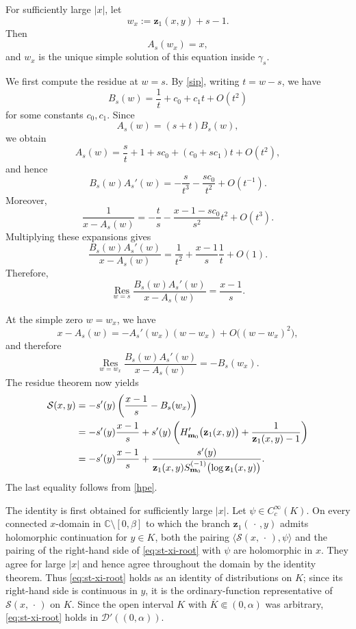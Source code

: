 \documentclass[11pt]{amsart}
\theoremstyle{plain}
\numberwithin{equation}{section}
\numberwithin{theorem}{section}
\numberwithin{figure}{section}
\begin{document}
For sufficiently large \(\lvert x\rvert\), let
\[
    w_x
    :=
    \mathbf z_1(x,y)+s-1.
\]
Then
\[
    A_s(w_x)=x,
\]
and \(w_x\) is the unique simple solution of this equation inside
\(\gamma_s\).

We first compute the residue at \(w=s\). By \eqref{sip}, writing
\(t=w-s\), we have
\[
    B_s(w)
    =
    \frac1t+c_0+c_1t+O(t^2)
\]
for some constants \(c_0,c_1\). Since
\[
    A_s(w)=(s+t)B_s(w),
\]
we obtain
\[
    A_s(w)
    =
    \frac{s}{t}
    +
    1+sc_0
    +
    (c_0+sc_1)t
    +
    O(t^2),
\]
and hence
\[
    B_s(w)A_s'(w)
    =
    -\frac{s}{t^3}
    -
    \frac{sc_0}{t^2}
    +
    O(t^{-1}).
\]
Moreover,
\[
    \frac1{x-A_s(w)}
    =
    -\frac{t}{s}
    -
    \frac{x-1-sc_0}{s^2}t^2
    +
    O(t^3).
\]
Multiplying these expansions gives
\[
    \frac{B_s(w)A_s'(w)}
         {x-A_s(w)}
    =
    \frac1{t^2}
    +
    \frac{x-1}{s}\frac1t
    +
    O(1).
\]
Therefore,
\[
    \operatorname*{Res}_{w=s}
    \frac{B_s(w)A_s'(w)}
         {x-A_s(w)}
    =
    \frac{x-1}{s}.
\]

At the simple zero \(w=w_x\), we have
\[
    x-A_s(w)
    =
    -A_s'(w_x)(w-w_x)
    +
    O\bigl((w-w_x)^2\bigr),
\]
and therefore
\[
    \operatorname*{Res}_{w=w_x}
    \frac{B_s(w)A_s'(w)}
         {x-A_s(w)}
    =
    -B_s(w_x).
\]
The residue theorem now yields
\begin{align}
\mathcal S(x,y)
&=
-s'(y)
\left(
    \frac{x-1}{s}
    -
    B_s(w_x)
\right)\notag\\
&=
-s'(y)\frac{x-1}{s}
+
 s'(y)
\left(
    H'_{\mathbf m_0}
    \bigl(\mathbf z_1(x,y)\bigr)
    +
    \frac{1}{\mathbf z_1(x,y)-1}
\right)\notag\\
&=
-s'(y)\frac{x-1}{s}
+
\frac{s'(y)}{
    \mathbf z_1(x,y)
    S_{\mathbf m_0}^{(-1)}
    \bigl(\log\mathbf z_1(x,y)\bigr)
}.
\label{eq:st-xi-root}
\end{align}
The last equality follows from \eqref{hpe}.

The identity is first obtained for sufficiently large
$\lvert x\rvert$. Let $\psi\in C_c^\infty(K)$. On every connected
$x$-domain in
$\mathbb C\setminus[0,\beta]$ to which the branch
$\mathbf z_1(\,\cdot\,,y)$ admits holomorphic continuation for
$y\in K$, both the pairing
$\langle\mathcal S(x,\,\cdot\,),\psi\rangle$ and the pairing of the
right-hand side of \eqref{eq:st-xi-root} with $\psi$ are holomorphic
in $x$. They agree for large $\lvert x\rvert$ and hence agree throughout
the domain by the identity theorem. Thus \eqref{eq:st-xi-root} holds as
an identity of distributions on $K$; since its right-hand side is
continuous in $y$, it is the ordinary-function representative of
$\mathcal S(x,\,\cdot\,)$ on $K$. Since the open interval $K$ with
$\overline K\Subset(0,\alpha)$ was arbitrary,
\eqref{eq:st-xi-root} holds in $\mathcal D'((0,\alpha))$.
\end{document}
